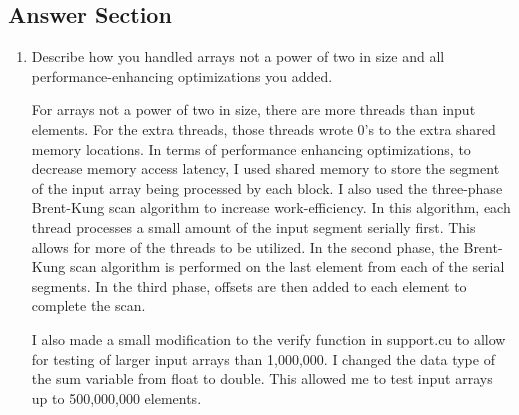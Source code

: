 \documentclass{article}
\begin{document}
\subsection{Answer Section}
\begin{enumerate}
	\item Describe how you handled arrays not a power of two in size and all performance-enhancing optimizations you added.
	
	For arrays not a power of two in size, there are more threads than input elements. For the extra threads, those threads wrote 0's to the extra shared memory locations. In terms of performance enhancing optimizations, to decrease memory access latency, I used shared memory to store the segment of the input array being processed by each block. I also used the three-phase Brent-Kung scan algorithm to increase work-efficiency. In this algorithm, each thread processes a small amount of the input segment serially first. This allows for more of the threads to be utilized. In the second phase, the Brent-Kung scan algorithm is performed on the last element from each of the serial segments. In the third phase, offsets are then added to each element to complete the scan. 
	
	I also made a small modification to the verify function in support.cu to allow for testing of larger input arrays than 1,000,000. I changed the data type of the sum variable from float to double. This allowed me to test input arrays up to 500,000,000 elements.
\end{enumerate}
	
\end{document}
